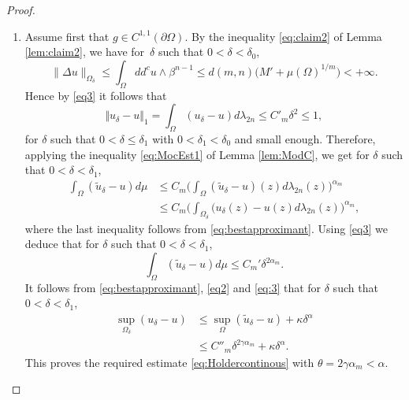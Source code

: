 \documentclass[JEP,XML,SOM,Unicode]{cedram}
\theoremstyle{definition}
\begin{document}
\begin{proof}
\begin{enumerate}
\item
Assume first that $g \in C^{1,1} (\partial \Omega)$.
By the inequality \eqref{eq:claim2} of Lemma \ref{lem:claim2}, we have for~$\delta$ such that $0 < \delta < \delta_0$,
\[
\|\Delta u\|_{\Omega_\delta} \leq \int_\Omega dd^c u \wedge \beta^{n - 1}\leq d(m,n) \bigl(M' + \mu (\Omega)^{1 \slash m}\bigr) < + \infty.
\]
Hence by \eqref{eq3} it follows that
\begin{equation*} \label{eq4}
\Vert {u}_{\delta} - u \Vert_1 = \int_{\Omega}({u}_{\delta}-u)d\lambda_{2n} \leq C'_m \delta^2 \leq 1,
\end{equation*}
for $\delta$ such that $0 < \delta \leq \delta_1$ with $0 < \delta_1 < \delta_0$ and small enough. Therefore, applying the inequality \eqref{eq:MocEst1} of Lemma \ref{lem:ModC}, we get for $\delta$ such that $0 < \delta < \delta_1$,
\begin{align*}
\int_{\Omega}(\tilde{u}_{\delta}-u)d\mu & \leq C_m \biggl(\int_{\Omega}(\tilde{u}_{\delta}-u)(z)d\lambda_{2 n} (z)\biggr)^{\alpha_m} \\
&\leq C_m\biggl(\int_{\Omega_{\delta}}({u}_{\delta}(z)-u(z)d\lambda_{2 n} (z)\biggr)^{\alpha_m},
\end{align*}
where the last inequality follows from \eqref{eq:bestapproximant}. Using \eqref{eq3} we deduce that for $\delta$ such that $0 < \delta < \delta_1$,
\begin{equation} \label{eq:3}
\int_{\Omega}(\tilde{u}_{\delta}-u)d\mu \leq C_m' \delta^{2 \alpha_m}.
\end{equation}
It follows from \eqref{eq:bestapproximant}, \eqref{eq2} and \eqref{eq:3} that for $\delta$ such that $0 < \delta < \delta_1$,
\begin{equation*} \label{eq:finalestimate}
\begin{split}
\sup_{\Omega_{\delta}}( {u}_{\delta}-u)&\leq\sup_{\Omega}(\tilde{u}_{\delta}-u)+ \kappa \delta^{\alpha} \\
&\leq  {C''_m} \delta^{2\gamma\alpha_m} + \kappa \delta^{\alpha}.
\end{split}
\end{equation*}
This proves the required estimate \eqref{eq:Holdercontinous} with $\theta = 2 \gamma \alpha_m < \alpha$.


\end{enumerate}
\end{proof}
\end{document}
